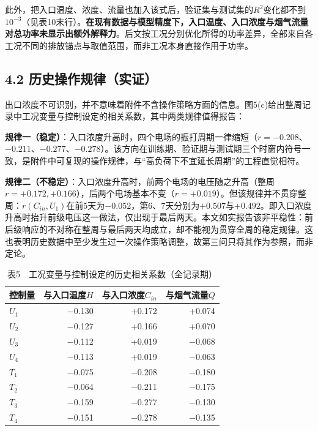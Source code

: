 \documentclass[UTF8,zihao=5,a4paper]{ctexart}
\begin{document}
此外，把入口温度、浓度、流量也加入该式后，验证集与测试集的$R^2$变化都不到$10^{-3}$（见表10末行）。\textbf{在现有数据与模型精度下，入口温度、入口浓度与烟气流量对总功率未显示出额外解释力}。后文按工况分别优化所得的功率差异，全部来自各工况不同的排放锚点与取值范围，而非工况本身直接作用于功率。

\subsection*{4.2 历史操作规律（实证）}

出口浓度不可识别，并不意味着附件不含操作策略方面的信息。图5(c)给出整周记录中工况变量与控制设定的相关系数，其中两类规律值得报告：

\textbf{规律一（稳定）}：入口浓度升高时，四个电场的振打周期一律缩短（$r=-0.208$、$-0.211$、$-0.277$、$-0.278$）。该方向在训练期、验证期与测试期三个时窗内符号一致，是附件中可复现的操作规律，与“高负荷下不宜延长周期”的工程直觉相符。

\textbf{规律二（不稳定）}：入口浓度升高时，前两个电场的电压随之升高（整周$r=+0.172,+0.166$），后两个电场基本不变（$r=+0.019$）。但该规律并不贯穿整周：$r(C_{in},U_1)$在前5天为$-0.052$，第6、7天分别为$+0.507$与$+0.492$。即入口浓度升高时抬升前级电压这一做法，仅出现于最后两天。本文如实报告该非平稳性：前后级响应的不对称在整周与最后两天均成立，却不能视为贯穿全周的稳定规律。这也表明历史数据中至少发生过一次操作策略调整，故第三问只将其作为参照，而非定论。


\begin{table}[htb]
\centering
\caption*{\normalsize 表5　工况变量与控制设定的历史相关系数（全记录期）}
\vspace{-2pt}
\begin{tabular}{lrrr}
\toprule
控制量 & 与入口温度$H$ & 与入口浓度$C_{in}$ & 与烟气流量$Q$ \\
\midrule
$U_1$ & −0.130 & +0.172 & +0.074 \\
$U_2$ & −0.127 & +0.166 & +0.070 \\
$U_3$ & −0.112 & +0.019 & −0.068 \\
$U_4$ & −0.113 & +0.019 & −0.063 \\
$T_1$ & −0.075 & −0.208 & −0.180 \\
$T_2$ & −0.064 & −0.211 & −0.175 \\
$T_3$ & −0.159 & −0.277 & −0.130 \\
$T_4$ & −0.151 & −0.278 & −0.135 \\
\bottomrule
\end{tabular}
\end{table}
\end{document}
